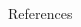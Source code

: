 \documentclass[final,hyperref={pdfpagelabels=false},notheorems]{beamer}
\theoremstyle{thesisstyle}
\begin{document}
\begin{frame}[t]
\begin{columns}[t]
\begin{column}{.505\textwidth}
    \begin{block}{References}
      \linespread{0.928}\selectfont
      \printbibliography[heading=none]
    \end{block}

  \end{column}

  \begin{column}{.02\textwidth}\end{column} %

\end{columns} %

\end{frame} %
\end{document}
